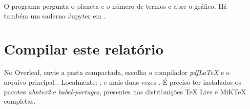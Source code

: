 O programa pergunta o planeta e o número de termos e abre o gráfico. Há também um caderno Jupyter em .

\section{Compilar este relatório}

No Overleaf, envie a pasta  compactada, escolha o compilador \emph{pdfLaTeX} e o arquivo principal . Localmente: ,  e mais duas vezes . É preciso ter instalados os pacotes \emph{abntex2} e \emph{babel-portuges}, presentes nas distribuições TeX Live e MiKTeX completas.

